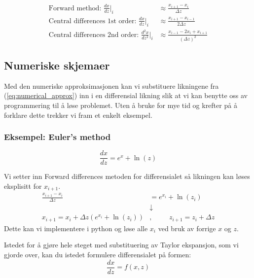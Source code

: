 \begin{equation}
    \begin{split}
    \label{eq:numerical_approx}        
    \text{Forward method: }\frac{dx}{dz}\Big|_i &\approx \frac{x_{i+1}-x_i}{\Delta z} \\
    \text{Central differences 1st order: }\frac{dx}{dz}\Big|_i &\approx \frac{x_{i+1}-x_{i-1}}{2\Delta z}\\
    \text{Central differences 2nd order: }\frac{d^2x}{dz^2}\Big|_i &\approx \frac{x_{i-1}-2x_i+x_{i+1}}{(\Delta z)^2}
    \end{split}
\end{equation}
    

\subsection{Numeriske skjemaer}
Med den numeriske approksimasjonen kan vi substituere likningene fra (\ref{eq:numerical_approx}) inn i en differensial likning slik at vi kan benytte oss av programmering til å løse problemet. Uten å bruke for mye tid og krefter på å forklare dette trekker vi fram et enkelt eksempel.

\subsubsection{Eksempel: Euler's method}\label{sec:euler_numerical}

\begin{equation}
    \frac{dx}{dz} = e^x + \ln (z)  
\end{equation}

Vi setter inn Forward differences metoden for differensialet så likningen kan løses eksplisitt for $x_{i+1}$.
\begin{align}
    \frac{x_{i+1}-x_i}{\Delta z} &= e^{x_i} + \ln (z_i)  \\
    &\downarrow \\
    \label{eq:eulers_methdo_example}
    x_{i+1} = x_i +\Delta z(e^{x_i} + \ln (z_i))&, \hspace{1cm} z_{i+1} = z_i + \Delta z
\end{align}
Dette kan vi implementere i python og løse alle $x_i$ ved bruk av forrige $x$ og $z$.

Istedet for å gjøre hele steget med substituering av Taylor ekspansjon, som vi gjorde over, kan du istedet formulere differensialet på formen:
\begin{equation}
     \frac{dx}{dz} = f(x,z)
\end{equation}

